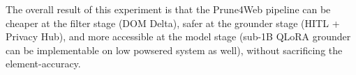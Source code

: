 The overall result of this experiment is that the Prune4Web pipeline can be cheaper at the filter stage (DOM Delta), safer at the grounder stage (HITL + Privacy Hub), and more accessible at the model stage (sub-1B QLoRA grounder can be implementable on low powsered system as well), without sacrificing the element-accuracy.

